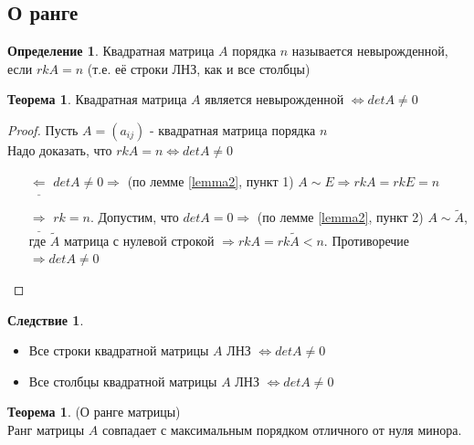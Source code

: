 \documentclass[a4paper, 12pt]{article}
\newcommand\tab[1][.5cm]{\hspace*{#1}}
\newcounter{thcount}
\theoremstyle{definition}
\newtheorem*{definition}{Определение}
\newtheorem*{theorem}{Теорема}
\newtheorem*{consequense}{Следствие}
\newtheorem{theoremnum}[thcount]{Теорема}
\begin{document}
  \subsection{О ранге}
  \begin{definition}
    Квадратная матрица $A$ порядка $n$ называется невырожденной, если $rkA = n$ (т.е. её строки ЛНЗ, как и все столбцы)
  \end{definition}
  \begin{theoremnum}
    Квадратная матрица $A$ является невырожденной $\Longleftrightarrow detA \not = 0$ 
  \end{theoremnum}  
  \begin{proof}
    Пусть $A = (a_{ij})$ - квадратная матрица порядка $n$ \\
    Надо доказать, что $rkA=n \Longleftrightarrow detA \not = 0$ 
    \begin{itemize}
      \item[$\underline{\Longleftarrow} $] $detA \not = 0 \Longrightarrow $ (по лемме \eqref{lemma2}, пункт 1) $A \sim E \Longrightarrow rkA = rkE = n$
      \item[$\underline{\Longrightarrow} $] $rk = n$. Допустим, что $detA = 0 \Longrightarrow $ (по лемме \eqref{lemma2}, пункт 2) $A \sim \widetilde{A}$, где $\widetilde{A}$ матрица с нулевой строкой $\Longrightarrow rkA = rk \widetilde{A} < n$. Противоречие $\Longrightarrow detA \not = 0$        
    \end{itemize}
  \end{proof} 
  \begin{consequense} \tab
    \begin{itemize}
      \item Все строки квадратной матрицы $A$ ЛНЗ $\Longleftrightarrow detA \not = 0$
      \item Все столбцы квадратной матрицы $A$ ЛНЗ $\Longleftrightarrow detA \not = 0$
    \end{itemize}
  \end{consequense} 
  \begin{theorem}
    (О ранге матрицы) \\
    Ранг матрицы $A$ совпадает с максимальным порядком отличного от нуля минора.
  \end{theorem}  
\end{document}
